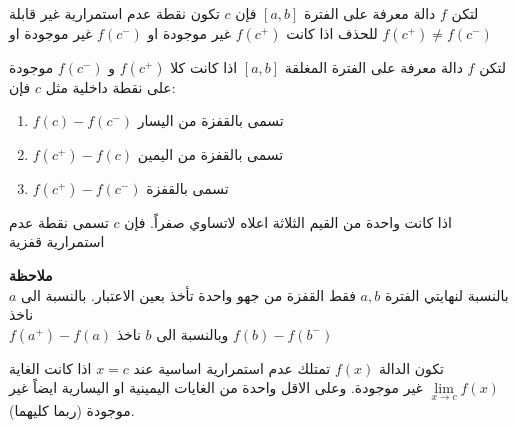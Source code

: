 \begin{definition}
	لتكن $f$ دالة معرفة على الفترة $[a, b]$ فإن $c$ تكون نقطة عدم استمرارية غير قابلة للحذف اذا كانت $f(c^+)$ غير موجودة او $f(c^-)$ غير موجودة او $f(c^+) \neq f(c^-)$
\end{definition}

\begin{definition}
	لتكن $f$ دالة معرفة على الفترة المغلقة $[a, b]$ اذا كانت كلا $f(c^+)$ و $f(c^-)$ موجودة على نقطة داخلية مثل $c$ فإن:
	\begin{enumerate}
		\item $f(c) - f(c^-)$ تسمى بالقفزة من اليسار 
		\item  $f(c^+) - f(c)$ تسمى بالقفزة من اليمين
		\item $f(c^+) - f(c^-)$ تسمى بالقفزة
	\end{enumerate}
	اذا كانت واحدة من القيم الثلاثة اعلاه لاتساوي صفراً. فإن $c$ تسمى نقطة عدم استمرارية قفزية\\ 
\end{definition}

\noindent
\textbf{ملاحظة}\\
بالنسبة لنهايتي الفترة $a, b$ فقط القفزة من جهو واحدة  تأخذ بعين الاعتبار. بالنسبة الى $a$ ناخذ\\ $f(a^+) - f(a)$ وبالنسبة الى $b$ ناخذ $f(b) - f(b^-)$


\begin{definition}
 	تكون الدالة $f(x)$ تمتلك عدم استمرارية اساسية 
عند $x=c$ اذا كانت الغاية 
$\lim\limits_{x\to c} f(x)$ غير موجودة. وعلى الاقل واحدة من الغايات اليمينية او اليسارية ايضاً غير موجودة (ربما كليهما).
\end{definition}

